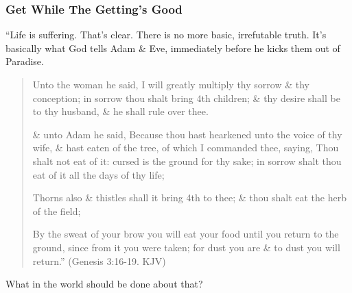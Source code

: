 \documentclass{article}
\begin{document}
\subsubsection{Get While The Getting's Good}
``Life is suffering. That's clear. There is no more basic, irrefutable truth. It's basically what God tells Adam \& Eve, immediately before he kicks them out of Paradise.
\begin{quotation}
	Unto the woman he said, I will greatly multiply thy sorrow \& thy conception; in sorrow thou shalt bring 4th children; \& thy desire shall be to thy husband, \& he shall rule over thee.
	
	\& unto Adam he said, Because thou hast hearkened unto the voice of thy wife, \& hast eaten of the tree, of which I commanded thee, saying, Thou shalt not eat of it: cursed is the ground for thy sake; in sorrow shalt thou eat of it all the days of thy life;
	
	Thorns also \& thistles shall it bring 4th to thee; \& thou shalt eat the herb of the field;
	
	By the sweat of your brow you will eat your food until you return to the ground, since from it you were taken; for dust you are \& to dust you will return.'' (Genesis 3:16-19. KJV)
\end{quotation}
What in the world should be done about that?
\end{document}
